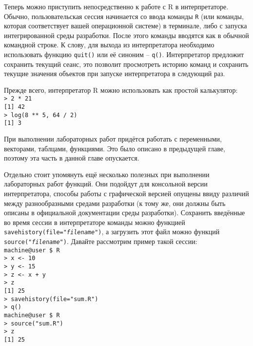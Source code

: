     Теперь можно приступить непосредственно к работе с R в интерпретаторе. Обычно, 
    пользовательская сессия начинается со ввода команды \texttt{R} (или команды, 
    которая соответствует вашей операционной системе) в терминале, либо с запуска 
    интегрированной среды разработки. После этого команды вводятся как в обычной
    командной строке. К слову, для выхода из интерпретатора необходимо использовать
    функцию \texttt{quit()} или её синоним -- \texttt{q()}. Интерпретатор предложит
    сохранить текущий сеанс, это позволит просмотреть историю команд и сохранить
    текущие значения объектов при запуске интерпретатора в следующий раз.

    Прежде всего, интерпретатор R можно использовать как простой калькулятор: \\
    \indent\texttt{> 2 * 21} \\
    \indent\texttt{[1] 42} \\
    \indent\texttt{> log(8 ** 5, 64 / 2)} \\
    \indent\texttt{[1] 3}

    При выполнении лабораторных работ придётся работать с переменными, векторами,
    таблцами, функциями. Это было описано в предыдущей главе, поэтому эта часть в
    данной главе опускается.

    Отдельно стоит упомянуть ещё несколько полезных при выполнении лабораторных работ 
    функций. Они подойдут для консольной версии интерпретатора, способы работы с 
    графической версией опущены ввиду различий между разнообразными средами 
    разработки (к тому же, они должны быть описаны в официальной документации среды 
    разработки). Сохранить введённые во время сессии в интерпретаторе команды можно 
    функцией \texttt{savehistory(file="\textit{filename}")}, а загрузить этот файл 
    можно функций \texttt{source("\textit{filename}")}. Давайте рассмотрим пример 
    такой сессии: \\
    \indent\texttt{machine@user \$ R} \\
    \indent\texttt{> x <- 10} \\
    \indent\texttt{> y <- 15} \\
    \indent\texttt{> z <- x + y} \\
    \indent\texttt{> z} \\
    \indent\texttt{[1] 25} \\
    \indent\texttt{> savehistory(file="sum.R")} \\
    \indent\texttt{> q()} \\
    \indent\texttt{machine@user \$ R} \\
    \indent\texttt{> source("sum.R")} \\
    \indent\texttt{> z} \\
    \indent\texttt{[1] 25}

